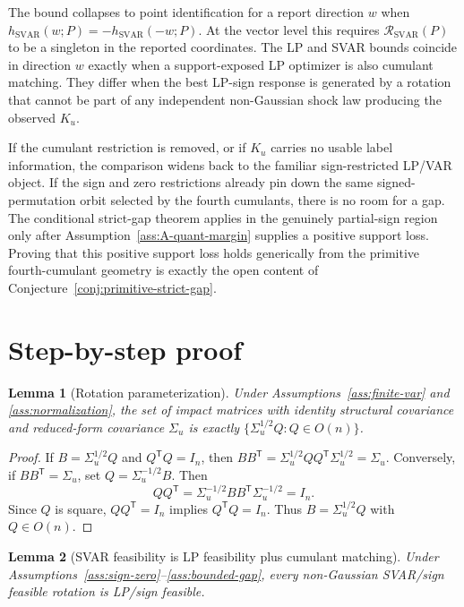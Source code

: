 \documentclass[11pt]{article}
\newcommand{\transpose}{\mathsf{T}}
\theoremstyle{definition}
\theoremstyle{plain}
\newtheorem{lemma}{Lemma}
\theoremstyle{remark}
\begin{document}
The bound collapses to point identification for a report direction \(w\) when
\(h_{\mathrm{SVAR}}(w;P)=-h_{\mathrm{SVAR}}(-w;P)\).  At the vector level this
requires \(\mathcal R_{\mathrm{SVAR}}(P)\) to be a singleton in the reported
coordinates.  The LP and SVAR bounds coincide in direction \(w\) exactly when a
support-exposed LP optimizer is also cumulant matching.  They differ when the
best LP-sign response is generated by a rotation that cannot be part of any
independent non-Gaussian shock law producing the observed \(K_u\).

If the cumulant restriction is removed, or if \(K_u\) carries no usable label
information, the comparison widens back to the familiar sign-restricted
LP/VAR object.  If the sign and zero restrictions already pin down the same
signed-permutation orbit selected by the fourth cumulants, there is no room for
a gap.  The conditional strict-gap theorem applies in the genuinely
partial-sign region only after Assumption~\ref{ass:A-quant-margin} supplies a
positive support loss.  Proving that this positive support loss holds
generically from the primitive fourth-cumulant geometry is exactly the open
content of Conjecture~\ref{conj:primitive-strict-gap}.

\section{Step-by-step proof}
\begin{lemma}[Rotation parameterization]\label{lem:rotation}
Under Assumptions~\ref{ass:finite-var} and \ref{ass:normalization}, the set of
impact matrices with identity structural covariance and reduced-form
covariance \(\Sigma_u\) is exactly
\(\{\Sigma_u^{1/2}Q:Q\in O(n)\}\).
\end{lemma}

\begin{proof}
If \(B=\Sigma_u^{1/2}Q\) and \(Q^\transpose Q=I_n\), then
\(BB^\transpose=\Sigma_u^{1/2}QQ^\transpose\Sigma_u^{1/2}=\Sigma_u\).  Conversely,
if \(BB^\transpose=\Sigma_u\), set \(Q=\Sigma_u^{-1/2}B\).  Then
\[
QQ^\transpose=\Sigma_u^{-1/2}BB^\transpose\Sigma_u^{-1/2}=I_n.
\]
Since \(Q\) is square, \(QQ^\transpose=I_n\) implies \(Q^\transpose Q=I_n\).
Thus \(B=\Sigma_u^{1/2}Q\) with \(Q\in O(n)\).
\end{proof}

\begin{lemma}[SVAR feasibility is LP feasibility plus cumulant matching]\label{lem:constraint-inclusion}
Under Assumptions~\ref{ass:sign-zero}--\ref{ass:bounded-gap}, every
non-Gaussian SVAR/sign feasible rotation is LP/sign feasible.
\end{lemma}
\end{document}
